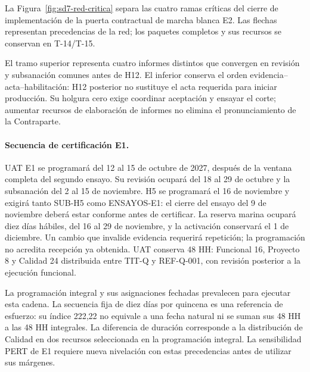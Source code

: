 

La Figura~\ref{fig:sd7-red-critica} separa las cuatro ramas críticas del cierre de implementación de la puerta contractual de marcha blanca E2. Las flechas representan precedencias de la red; los paquetes completos y sus recursos se conservan en T-14/T-15.



El tramo superior representa cuatro informes distintos que convergen en revisión y subsanación comunes antes de H12. El inferior conserva el orden evidencia--acta--habilitación: H12 posterior no sustituye el acta requerida para iniciar producción. Su holgura cero exige coordinar aceptación y ensayar el corte; aumentar recursos de elaboración de informes no elimina el pronunciamiento de la Contraparte.

\paragraph{Secuencia de certificación E1.}
UAT E1 se programará del 12 al 15 de octubre de 2027, después de la ventana completa del segundo ensayo. Su revisión ocupará del 18 al 29 de octubre y la subsanación del 2 al 15 de noviembre. H5 se programará el 16 de noviembre y exigirá tanto SUB-H5 como ENSAYOS-E1: el cierre del ensayo del 9 de noviembre deberá estar conforme antes de certificar. La reserva marina ocupará diez días hábiles, del 16 al 29 de noviembre, y la activación conservará el 1 de diciembre. Un cambio que invalide evidencia requerirá repetición; la programación no acredita recepción ya obtenida. UAT conserva 48 HH: Funcional 16, Proyecto 8 y Calidad 24 distribuida entre TIT-Q y REF-Q-001, con revisión posterior a la ejecución funcional. \parencite[arts.~17--18; Formulario E-25]{bases-admin}

La programación integral y sus asignaciones fechadas prevalecen para ejecutar esta cadena. La secuencia fija de diez días por quincena es una referencia de esfuerzo: su índice 222,22 no equivale a una fecha natural ni se suman sus 48 HH a las 48 HH integrales. La diferencia de duración corresponde a la distribución de Calidad en dos recursos seleccionada en la programación integral. La sensibilidad PERT de E1 requiere nueva nivelación con estas precedencias antes de utilizar sus márgenes.




